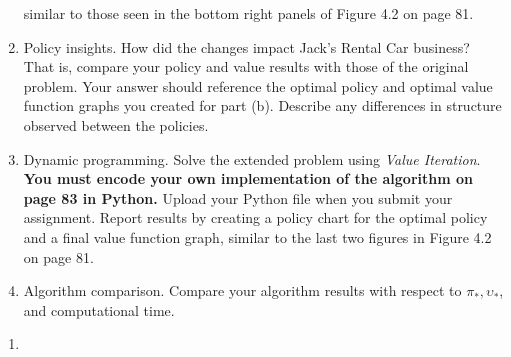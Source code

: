 \documentclass[12pt,letterpaper]{exam}
\begin{document}
\begin{questions}
\begin{enumerate}[label= (\alph*)]
		similar to those seen in the bottom right panels of Figure 4.2 on page 81.
		\item 
		Policy insights. How did the changes impact Jack's Rental Car business? That is, compare
		your policy and value results with those of the original problem. Your answer should reference
		the optimal policy and optimal value function graphs you created for part (b). Describe any
		differences in structure observed between the policies.
		\item 
		Dynamic programming. Solve the extended problem using \emph{Value Iteration}. 
		\textbf{You must encode your own implementation of the algorithm on page 83 in Python.} 
		Upload your Python file when you submit your assignment. 
		Report results by creating a policy chart for the optimal policy and a final value function graph, 
		similar to the last two figures in Figure 4.2 on page 81.
		\item 
		Algorithm comparison. Compare your algorithm results with respect to \(\pi_*,\upsilon_*\),
		and computational time.
	\end{enumerate}
	\begin{solution}
		\begin{enumerate}
			\item 
		\end{enumerate}
	\end{solution}

\end{questions}
\printbibliography%
\end{document}

